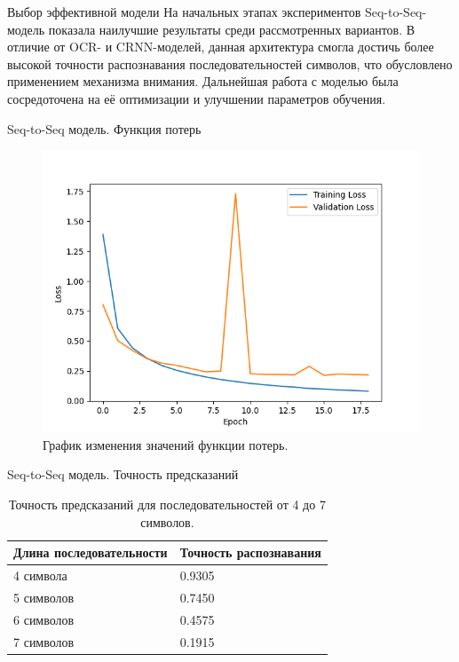 \documentclass[12pt,a4paper,mathserif]{beamer}
\begin{document}
\begin{frame}{Выбор эффективной модели}
    \setlength{\parindent}{0.5cm}
    На начальных этапах экспериментов Seq-to-Seq-модель показала наилучшие результаты среди рассмотренных вариантов. В отличие от OCR- и CRNN-моделей, данная архитектура смогла достичь более высокой точности распознавания последовательностей символов, что обусловлено применением механизма внимания. Дальнейшая работа с моделью была сосредоточена на её оптимизации и улучшении параметров обучения.
\end{frame}

\begin{frame}{Seq-to-Seq модель. Функция потерь}
    \begin{figure}[H]
        \centering
        \includegraphics[width=0.7\linewidth]{imgs/Model_loss.png}
        \caption{График изменения значений функции потерь.}
        \label{fig:loss}
    \end{figure}
\end{frame}

\begin{frame}{Seq-to-Seq модель. Точность предсказаний}
    \begin{table}[H]
    \centering
    \caption{Точность предсказаний для последовательностей от 4 до 7 символов.}
    \begin{tabular}{|l|l|}
        \hline
        Длина последовательности & Точность распознавания \\
        \hline
        4 символа & 0.9305 \\
        \hline
        5 символов & 0.7450 \\
        \hline
        6 символов & 0.4575 \\
        \hline
        7 символов & 0.1915 \\
        \hline
    \end{tabular}
    \label{tab:probability}
\end{table}
\end{frame}
\end{document}
